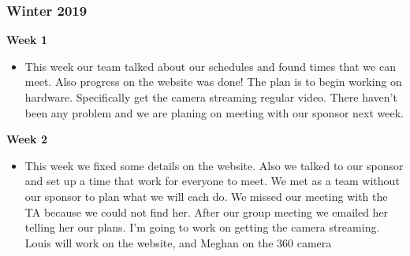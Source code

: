         \subsubsection{Winter 2019}
            \textbf{Week 1}
            \begin{itemize}
                \item This week our team talked about our schedules and found times that we can meet. Also progress on the website was done! The plan is to begin working on hardware. Specifically get the camera streaming regular video. There haven't been any problem and we are planing on meeting with our sponsor next week. 
            \end{itemize}
            
            \textbf{Week 2}
            \begin{itemize}
                \item This week we fixed some details on the website. Also we talked to our sponsor and set up a time that work for everyone to meet. We met as a team without our sponsor to plan what we will each do. We missed our meeting with the TA because we could not find her. After our group meeting we emailed her telling her our plans. I’m going to work on getting the camera streaming.  Louis will work on the website, and Meghan on the 360 camera 
            \end{itemize}
            
